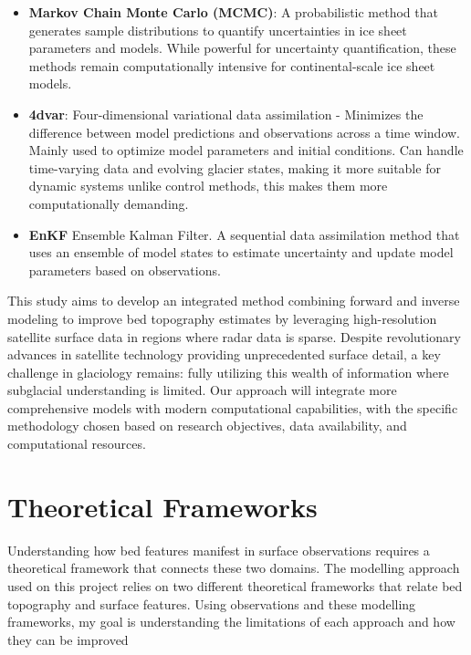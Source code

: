 \begin{itemize}
\begin{itemize}
            \item\textbf{Markov Chain Monte Carlo (MCMC)}: A probabilistic method that generates sample distributions to quantify uncertainties in ice sheet parameters and models\cite{Morlighem_Goldberg_2024}. While powerful for uncertainty quantification, these methods remain computationally intensive for continental-scale ice sheet models\cite{Morlighem_Goldberg_2024}.

            \item\textbf{4dvar}: Four-dimensional variational data assimilation - Minimizes the difference between model predictions and observations across a time window. Mainly used to optimize model parameters and initial conditions\cite{Morlighem_Goldberg_2024}. Can handle time-varying data and evolving glacier states, making it more suitable for dynamic systems unlike control methods, this makes them more computationally demanding\cite{Morlighem_Goldberg_2024}.

            \item\textbf{EnKF} Ensemble Kalman Filter. A sequential data assimilation method that uses an ensemble of model states to estimate uncertainty and update model parameters based on observations\cite{Morlighem_Goldberg_2024}.
        \end{itemize}
    
\end{itemize} 
This study aims to develop an integrated method combining forward and inverse modeling to improve bed topography estimates by leveraging high-resolution satellite surface data in regions where radar data is sparse. Despite revolutionary advances in satellite technology providing unprecedented surface detail, a key challenge in glaciology remains: fully utilizing this wealth of information where subglacial understanding is limited. Our approach will integrate more comprehensive models with modern computational capabilities, with the specific methodology chosen based on research objectives, data availability, and computational resources.

\newpage
\section{Theoretical Frameworks}
 Understanding how bed features manifest in surface observations requires a theoretical framework that connects these two domains. The modelling approach used on this project relies on two different theoretical frameworks that relate bed topography and surface features. Using observations and these modelling frameworks, my goal is understanding the limitations of each approach and how they can be improved

